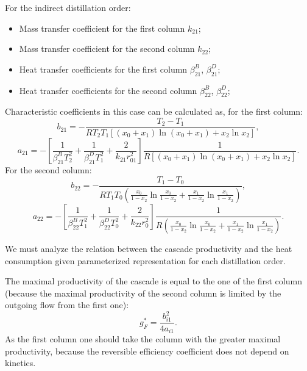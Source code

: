 \documentclass[12pt]{article}
\begin{document}
For the indirect distillation order:
\begin{itemize}
\item Mass transfer coefficient for the first column $k_{21}$;
\item Mass transfer coefficient for the second column $k_{22}$;
\item Heat transfer coefficients for the first column $\beta^B_{21}$, $\beta^D_{21}$;
\item Heat transfer coefficients for the second column $\beta^B_{22}$, $\beta^D_{22}$;
\end{itemize}

Characteristic coefficients in this case can be calculated as, for the first column:
\begin{equation}
b_{21} = -\frac{T_2 - T_1}{RT_2T_1\left[(x_0+x_1)\ln{(x_0+x_1)} + x_2\ln{x_2}\right]},
\label{eq:b1c2v}
\end{equation}
\begin{equation}
a_{21} = -\left[\frac{1}{\beta^B_{21}T_2^2} + \frac{1}{\beta^D_{21}T_1^2} + \frac{2}{k_{21}r_{01}^2}\right]\frac{1}{R\left[(x_0+x_1)\ln{(x_0+x_1)} + x_2\ln{x_2}\right]}.
\label{eq:a1c2v}
\end{equation}
For the second column:
\begin{equation}
b_{22} = -\frac{T_1 - T_0}{RT_1T_0(\frac{x_0}{1-x_2}\ln{\frac{x_0}{1-x_2}} + \frac{x_1}{1-x_2}\ln{\frac{x_1}{1-x_2}})},
\label{eq:b2c2v}
\end{equation}
\begin{equation}
a_{22} = -\left[\frac{1}{\beta^B_{22}T_1^2} + \frac{1}{\beta^D_{22}T_0^2} + \frac{2}{k_{22}r_0^2}\right]\frac{1}{R(\frac{x_0}{1-x_2}\ln{\frac{x_0}{1-x_2}} + \frac{x_1}{1-x_2}\ln{\frac{x_1}{1-x_2}})}.
\label{eq:a2c2v}
\end{equation}

We must analyze the relation between the cascade productivity and the heat consumption given parameterized representation for each distillation order.

The maximal productivity of the cascade is equal to the one of the first column (because the maximal productivity of the second column is limited by the outgoing flow from the first one): 
\begin{equation}
g_F^* = \frac{b_{i1}^2}{4a_{i1}}.
\label{eq:max-perf}
\end{equation}
As the first column one should take the column with the greater maximal productivity, because the reversible efficiency coefficient does not depend on kinetics.
\end{document}
